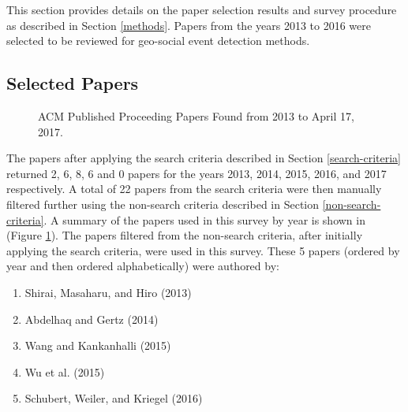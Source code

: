 This section provides details on the paper selection results and survey procedure as described in Section \ref{methods}. Papers from the years 2013 to 2016 were selected to be reviewed for geo-social event detection methods.

\subsection{Selected Papers} \label{selected-papers}

\begin{figure}
\begin{center}
\caption{ACM Published Proceeding Papers Found from 2013 to April 17, 2017.}
\label{fig:papersfound}
\end{center}
\end{figure}

The papers after applying the search criteria described in Section \ref{search-criteria} returned 2, 6, 8, 6 and 0 papers for the years 2013, 2014, 2015, 2016, and 2017 respectively. A total of 22 papers from the search criteria were then manually filtered further using the non-search criteria described in Section \ref{non-search-criteria}. A summary of the papers used in this survey by year is shown in (Figure \ref{fig:papersfound}). The papers filtered from the non-search criteria, after initially applying the search criteria, were used in this survey. These 5 papers (ordered by year and then ordered alphabetically) were authored by:

\begin{enumerate}[label=(\arabic*)]
  \item Shirai, Masaharu, and Hiro (2013) \cite{Shirai:2013}
  \item Abdelhaq and Gertz (2014) \cite{Abdelhaq:2014}
  \item Wang and Kankanhalli (2015) \cite{Wang:2015}
  \item Wu et al. (2015) \cite{Wu:2015}
  \item Schubert, Weiler, and Kriegel (2016) \cite{Schubert:2016}
\end{enumerate}


